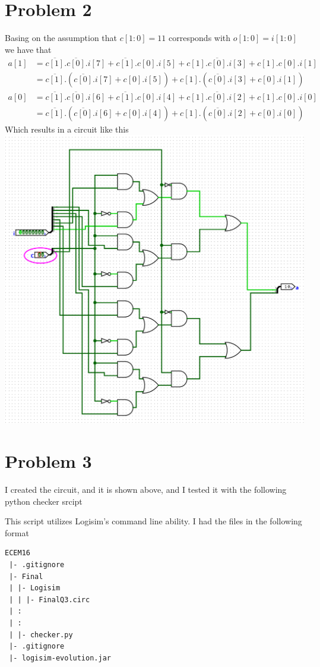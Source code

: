 \documentclass[12pt]{article}
\begin{document}
\section*{Problem 2}
Basing on the assumption that $c[1:0]=11$ corresponds with $o[1:0]=i[1:0]$
we have that 
\begin{align*}
    a[1]&=\overline{c[1]}.\overline{c[0]}.i[7]+\overline{c[1]}.c[0].i[5]+
        c[1].\overline{c[0]}.i[3]+c[1].c[0].i[1]\\
        &=\overline{c[1]}.(\overline{c[0]}.i[7]+c[0].i[5])+c[1].(\overline{c[0]}.i[3]+c[0].i[1])
\end{align*}
\begin{align*}
    a[0]&=\overline{c[1]}.\overline{c[0]}.i[6]+\overline{c[1]}.c[0].i[4]+
        c[1].\overline{c[0]}.i[2]+c[1].c[0].i[0]\\
        &=\overline{c[1]}.(\overline{c[0]}.i[6]+c[0].i[4])+c[1].(\overline{c[0]}.i[2]+c[0].i[0])
\end{align*}
Which results in a circuit like this\\
\includegraphics[scale=0.25]{fig1.png}
\section*{Problem 3}
I created the circuit, and it is shown above, and I tested it with the following python checker srcipt

This script utilizes Logisim's command line ability. I had the files in the following format
\begin{verbatim}
ECEM16
 |- .gitignore
 |- Final
 | |- Logisim
 | | |- FinalQ3.circ
 | :
 | :
 | |- checker.py
 |- .gitignore
 |- logisim-evolution.jar
\end{verbatim}
\end{document}
